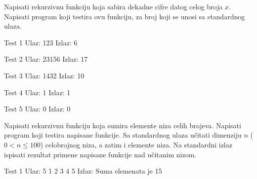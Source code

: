 \begin{Exercise}[label=111]
Napisati rekurzivnu funkciju koja sabira dekadne cifre datog
  celog broja $x$. Napisati program koji testira ovu funkciju, za broj
  koji se unosi sa standardnog ulaza.
  
\begin{minitest}
\begin{test}{Test 1}
Ulaz:    123  
Izlaz:   6 
\end{test}
\end{minitest}
\begin{minitest}
\begin{test}{Test 2}
Ulaz:    23156    
Izlaz:   17 
\end{test}
\end{minitest}
\begin{minitest}
\begin{test}{Test 3}
Ulaz:   1432
Izlaz:   10        
\end{test}
\end{minitest}

\begin{minitest}
\begin{test}{Test 4}
Ulaz:   1       
Izlaz:  1       
\end{test}
\end{minitest}
\begin{minitest}
\begin{test}{Test 5}
Ulaz:   0
Izlaz:  0
\end{test}
\end{minitest}

\end{Exercise}
\begin{Answer}[ref=111]
\end{Answer}


\begin{Exercise}[label=101]
Napisati rekurzivnu funkciju koja sumira elemente niza celih brojeva.  Napisati program koji testira napisane funkcije. Sa standardnog ulaza učitati dimenziju $n$  ($0 < n \leq 100$) celobrojnog
niza, a zatim i elemente niza. Na standardni izlaz ispisati
rezultat primene napisane funkcije nad učitanim
nizom.

\begin{miditest}
\begin{test}{Test 1}
Ulaz:  5 1 2 3 4 5   
Izlaz: Suma elemenata je 15
\end{test}
\end{miditest}

\end{Exercise}
\begin{Answer}[ref=101]
\end{Answer}

